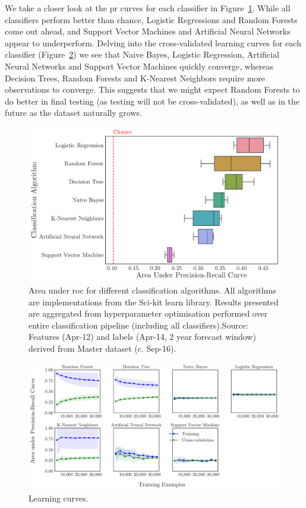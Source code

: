 \documentclass[../thesis/thesis.tex]{subfiles}
\begin{document}
We take a closer look at the \gls{pr} curves for each classifier in Figure~\ref{fig:design:classifier}. While all classifiers perform better than chance, Logistic Regressions and Random Forests come out ahead, and Support Vector Machines and Artificial Neural Networks appear to underperform. Delving into the cross-validated learning curves for each classifier (Figure~\ref{fig:design:create_learning_curves}) we see that Naive Bayes, Logistic Regression, Artificial Neural Networks and Support Vector Machines quickly converge, whereas Decision Trees, Random Forests and K-Nearest Neighbors require more observations to converge. This suggests that we might expect Random Forests to do better in final testing (as testing will not be cross-validated), as well as in the future as the dataset naturally grows.

\begin{figure}[!htb]
    \centering
    \includegraphics[width=\textwidth]{../figures/design/classifier}
    \caption[Area under PR Curves by classification algorithms]{Area under \gls{roc} for different classification algorithms. All algorithms are implementations from the Sci-kit learn library. Results presented are aggregated from hyperparameter optimisation performed over entire classification pipeline (including all classifiers).Source: Features (Apr-12) and labels (Apr-14, 2 year forecast window) derived from Master dataset (c. Sep-16).}
    \label{fig:design:classifier}
\end{figure}

\begin{figure}[!htb]
    \centering
    \includegraphics[width=\textwidth]{../figures/design/learning_curves_classifier}
    \caption[Learning curves by classification algorithms]{Learning curves.}
    \label{fig:design:create_learning_curves}
\end{figure}
\end{document}
